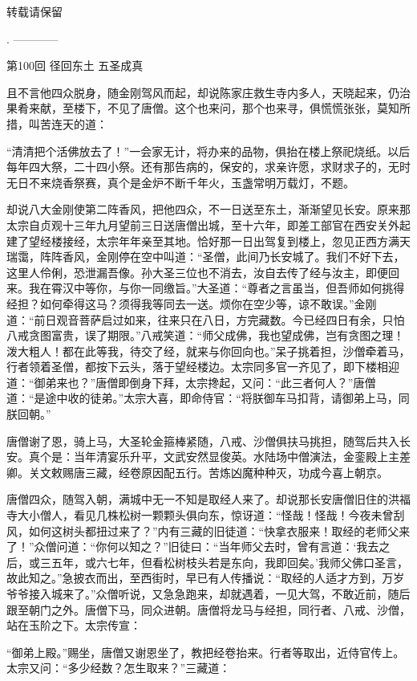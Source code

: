 \documentclass[12pt,UTF8]{ctexbook}
\begin{document}
{	转载请保留
	
	.
	------------
	
	第100回 径回东土      五圣成真
	
	且不言他四众脱身，随金刚驾风而起，却说陈家庄救生寺内多人，天晓起来，仍治果肴来献，至楼下，不见了唐僧。这个也来问，那个也来寻，俱慌慌张张，莫知所措，叫苦连天的道：
	
	“清清把个活佛放去了！”一会家无计，将办来的品物，俱抬在楼上祭祀烧纸。以后每年四大祭，二十四小祭。还有那告病的，保安的，求亲许愿，求财求子的，无时无日不来烧香祭赛，真个是金炉不断千年火，玉盏常明万载灯，不题。
	
	却说八大金刚使第二阵香风，把他四众，不一日送至东土，渐渐望见长安。原来那太宗自贞观十三年九月望前三日送唐僧出城，至十六年，即差工部官在西安关外起建了望经楼接经，太宗年年亲至其地。恰好那一日出驾复到楼上，忽见正西方满天瑞霭，阵阵香风，金刚停在空中叫道：“圣僧，此间乃长安城了。我们不好下去，这里人伶俐，恐泄漏吾像。孙大圣三位也不消去，汝自去传了经与汝主，即便回来。我在霄汉中等你，与你一同缴旨。”大圣道：“尊者之言虽当，但吾师如何挑得经担？如何牵得这马？须得我等同去一送。烦你在空少等，谅不敢误。”金刚道：“前日观音菩萨启过如来，往来只在八日，方完藏数。今已经四日有余，只怕八戒贪图富贵，误了期限。”八戒笑道：“师父成佛，我也望成佛，岂有贪图之理！泼大粗人！都在此等我，待交了经，就来与你回向也。”呆子挑着担，沙僧牵着马，行者领着圣僧，都按下云头，落于望经楼边。太宗同多官一齐见了，即下楼相迎道：“御弟来也？”唐僧即倒身下拜，太宗搀起，又问：“此三者何人？”唐僧道：“是途中收的徒弟。”太宗大喜，即命侍官：“将朕御车马扣背，请御弟上马，同朕回朝。”
	
	唐僧谢了恩，骑上马，大圣轮金箍棒紧随，八戒、沙僧俱扶马挑担，随驾后共入长安。真个是：当年清宴乐升平，文武安然显俊英。水陆场中僧演法，金銮殿上主差卿。关文敕赐唐三藏，经卷原因配五行。苦炼凶魔种种灭，功成今喜上朝京。
	
	唐僧四众，随驾入朝，满城中无一不知是取经人来了。却说那长安唐僧旧住的洪福寺大小僧人，看见几株松树一颗颗头俱向东，惊讶道：“怪哉！怪哉！今夜未曾刮风，如何这树头都扭过来了？”内有三藏的旧徒道：“快拿衣服来！取经的老师父来了！”众僧问道：“你何以知之？”旧徒曰：“当年师父去时，曾有言道：‘我去之后，或三五年，或六七年，但看松树枝头若是东向，我即回矣。’我师父佛口圣言，故此知之。”急披衣而出，至西街时，早已有人传播说：“取经的人适才方到，万岁爷爷接入城来了。”众僧听说，又急急跑来，却就遇着，一见大驾，不敢近前，随后跟至朝门之外。唐僧下马，同众进朝。唐僧将龙马与经担，同行者、八戒、沙僧，站在玉阶之下。太宗传宣：
	
	“御弟上殿。”赐坐，唐僧又谢恩坐了，教把经卷抬来。行者等取出，近侍官传上。太宗又问：“多少经数？怎生取来？”三藏道：
	
}
\end{document}
